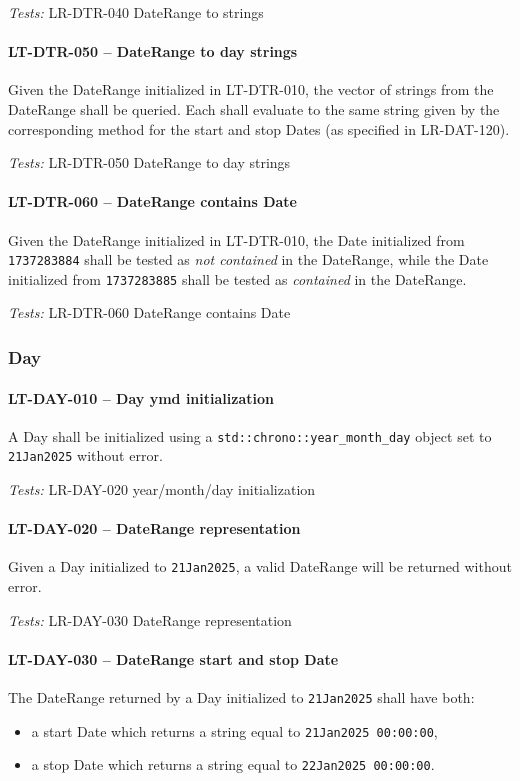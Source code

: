 \textit{Tests: } LR-DTR-040 DateRange to strings

\paragraph{LT-DTR-050 -- DateRange to day strings}
Given the DateRange initialized in LT-DTR-010, the vector of
strings from the DateRange shall be queried. Each shall evaluate
to the same string given by the corresponding method for the start and stop
Dates (as specified in LR-DAT-120).

\textit{Tests: } LR-DTR-050 DateRange to day strings

\paragraph{LT-DTR-060 -- DateRange contains Date}
Given the DateRange initialized in LT-DTR-010,
the Date initialized from \lstinline{1737283884} shall be
tested as \emph{not contained} in the DateRange, while the
Date initialized from \lstinline{1737283885} shall be
tested as \emph{contained} in the DateRange.

\textit{Tests: } LR-DTR-060 DateRange contains Date

\subsubsection{Day}
\paragraph{LT-DAY-010 -- Day ymd initialization}
A Day shall be initialized using a \lstinline{std::chrono::year_month_day}
object set to \lstinline{21Jan2025} without error.

\textit{Tests: } LR-DAY-020 year/month/day initialization

\paragraph{LT-DAY-020 -- DateRange representation}
Given a Day initialized to \lstinline{21Jan2025}, a valid DateRange
will be returned without error.

\textit{Tests: } LR-DAY-030 DateRange representation

\paragraph{LT-DAY-030 -- DateRange start and stop Date}
The DateRange returned by a Day initialized to \lstinline{21Jan2025}
shall have both:
\begin{itemize}
\item a start Date which returns a string equal to
  \lstinline{21Jan2025 00:00:00},
\item a stop Date which returns a string equal to
  \lstinline{22Jan2025 00:00:00}.
\end{itemize}

